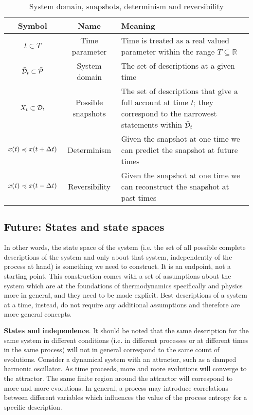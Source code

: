 \documentclass[10pt, onecolumn, longbibliography, nofootinbib]{revtex4-2}
\begin{document}
\begin{table}[h!]
	\centering
	\begin{tabular}{|c|c|p{6cm}|}
		\hline 
		Symbol & Name & Meaning \\ 
		\hline 
		$t \in T$ & Time parameter & Time is treated as a real valued parameter within the range $T \subseteq \mathbb{R}$ \\ 
		\hline 
		$\tdomain_t \subset \tdomain[P]$ & System domain & The set of descriptions at a given time \\ 
		\hline 
		$X_t \subset \tdomain_t$ & Possible snapshots & The set of descriptions that give a full account at time $t$; they correspond to the narrowest statements within $\tdomain_t$ \\ 
		\hline 
		$x(t) \narrower x(t + \Delta t)$ & Determinism & Given the snapshot at one time we can predict the snapshot at future times \\ 
		\hline 
		$x(t) \narrower x(t - \Delta t)$ & Reversibility & Given the snapshot at one time we can reconstruct the snapshot at past times \\ 
		\hline 
	\end{tabular} 
	\caption{System domain, snapshots, determinism and reversibility}
	\label{table:states}
\end{table}


\subsection{Future: States and state spaces}


In other words, the state space of the system (i.e. the set of all possible complete descriptions of the system and only about that system, independently of the process at hand) is something we need to construct. It is an endpoint, not a starting point. This construction comes with a set of assumptions about the system which are at the foundations of thermodynamics specifically and physics more in general, and they need to be made explicit. Best descriptions of a system at a time, instead, do not require any additional assumptions and therefore are more general concepts.


\textbf{States and independence}. It should be noted that the same description for the same system in different conditions (i.e. in different processes or at different times in the same process) will not in general correspond to the same count of evolutions. Consider a dynamical system with an attractor, such as a damped harmonic oscillator. As time proceeds, more and more evolutions will converge to the attractor. The same finite region around the attractor will correspond to more and more evolutions. In general, a process may introduce correlations between different variables which influences the value of the process entropy for a specific description.
\end{document}
